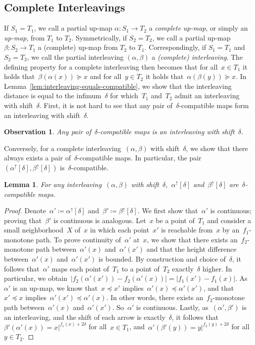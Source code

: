 \documentclass[11pt]{article}
\newtheorem{lemma}[theorem]{Lemma}
\newtheorem{observation}[theorem]{Observation}
\newcommand{\an}[2]{#1|^{#2}}
\begin{document}
\subsection{Complete Interleavings}\label{sec:complete-interleavings}
If $S_1=T_1$, we call a partial up-map $\alpha\colon S_1\to T_2$ a \emph{complete up-map}, or simply an \emph{up-map}, from $T_1$ to $T_2$.
Symmetrically, if $S_2=T_2$, we call a partial up-map $\beta\colon S_2\to T_1$ a (complete) up-map from $T_2$ to $T_1$.
Correspondingly, if $S_1=T_1$ and $S_2=T_2$, we call the partial interleaving $(\alpha,\beta)$ a \emph{(complete) interleaving}.
The defining property for a complete interleaving then becomes that for all~$x \in T_1$ it holds that~$\beta(\alpha(x)) \succeq x$ and for all~$y \in T_2$ it holds that~$\alpha(\beta(y)) \succeq x$.
In Lemma~\ref{lem:interleaving-equals-compatible}, we show that the interleaving distance is equal to the infimum~$\delta$ for which~$T_1$ and~$T_2$ admit an interleaving with shift~$\delta$.
First, it is not hard to see that any pair of~$\delta$-compatible maps form an interleaving with shift~$\delta$.
\begin{observation}\label{obs:compatible-interleaving}
    Any pair of~$\delta$-compatible maps is an interleaving with shift~$\delta$.
\end{observation}
%
\noindent
Conversely, for a complete interleaving~$(\alpha, \beta)$ with shift~$\delta$, we show that there always exists a pair of~$\delta$-compatible maps.
In particular, the pair~$(\alpha^\uparrow[\delta],\beta^\uparrow[\delta])$ is~$\delta$-compatible.
%
\begin{lemma}\label{lem:interleaving-compatible}
For any interleaving~$(\alpha, \beta)$ with shift~$\delta$,~$\alpha^\uparrow[\delta]$ and~$\beta^\uparrow[\delta]$ are~$\delta$-compatible maps.
\end{lemma}
\begin{proof}
    Denote~$\alpha' \coloneqq \alpha^\uparrow[\delta]$ and~$\beta' \coloneqq \beta^\uparrow[\delta]$.
	We first show that~$\alpha'$ is continuous; proving that~$\beta'$ is continuous is analogous.
	Let~$x$ be a point of~$T_1$ and consider a small neighborhood~$X$ of~$x$ in which each point~$x'$ is reachable from~$x$ by an~$f_1$-monotone path.
	To prove continuity of~$\alpha'$ at~$x$, we show that there exists an~$f_2$-monotone path between~$\alpha'(x)$ and~$\alpha'(x')$ and that the height difference between~$\alpha'(x)$ and~$\alpha'(x')$ is bounded.
    By construction and choice of~$\delta$, it follows that~$\alpha'$ maps each point of~$T_1$ to a point of~$T_2$ exactly~$\delta$ higher.
    In particular, we obtain~$|f_2(\alpha'(x')) - f_2(\alpha'(x))| = |f_1(x') - f_1(x)|$.
	As~$\alpha'$ is an up-map, we know that~$x \preceq x'$ implies~$\alpha'(x) \preceq \alpha'(x')$, and that~$x' \preceq x$ implies~$\alpha'(x') \preceq \alpha'(x)$.
    In other words, there exists an~$f_2$-monotone path between~$\alpha'(x)$ and~$\alpha'(x')$.
	So~$\alpha'$ is continuous.
%
	Lastly, as~$(\alpha', \beta')$ is an interleaving, and the shift of each arrow is exactly~$\delta$, it follows that~$\beta'(\alpha'(x)) = \an{x}{f_1(x) + 2\delta}$ for all~$x \in T_1$, and~$\alpha'(\beta'(y)) = \an{y}{f_2(y) + 2\delta}$ for all~$y \in T_2$.
\end{proof}
\end{document}
